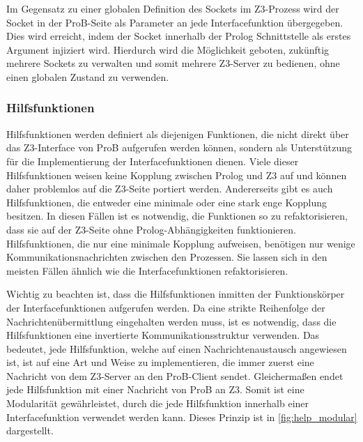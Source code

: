 Im Gegensatz zu einer globalen Definition des Sockets im Z3-Prozess wird der Socket in der ProB-Seite als Parameter an jede Interfacefunktion übergegeben.
Dies wird erreicht, indem der Socket innerhalb der Prolog Schnittstelle als erstes Argument injiziert wird.
Hierdurch wird die Möglichkeit geboten, zukünftig mehrere Sockets zu verwalten und somit mehrere Z3-Server zu bedienen, ohne einen globalen Zustand zu verwenden.

\subsubsection{Hilfsfunktionen}
\label{subsec:helper-functions}

Hilfsfunktionen werden definiert als diejenigen Funktionen, die nicht direkt über das Z3-Interface von ProB aufgerufen werden können,
sondern als Unterstützung für die Implementierung der Interfacefunktionen dienen.
Viele dieser Hilfsfunktionen weisen keine Kopplung zwischen Prolog und Z3 auf und können daher problemlos auf die Z3-Seite portiert werden.
Andererseits gibt es auch Hilfsfunktionen, die entweder eine minimale oder eine stark enge Kopplung besitzen.
In diesen Fällen ist es notwendig, die Funktionen so zu refaktorisieren, dass sie auf der Z3-Seite ohne Prolog-Abhängigkeiten funktionieren.
Hilfsfunktionen, die nur eine minimale Kopplung aufweisen, benötigen nur wenige Kommunikationsnachrichten zwischen den Prozessen.
Sie lassen sich in den meisten Fällen ähnlich wie die Interfacefunktionen refaktorisieren.

Wichtig zu beachten ist, dass die Hilfsfunktionen inmitten der Funktionskörper der Interfacefunktionen aufgerufen werden.
Da eine strikte Reihenfolge der Nachrichtenübermittlung eingehalten werden muss, ist es notwendig, dass die Hilfsfunktionen
eine invertierte Kommunikationsstruktur verwenden.
Das bedeutet, jede Hilfsfunktion, welche auf einen Nachrichtenaustausch angewiesen ist, ist auf eine Art und Weise zu implementieren,
die immer zuerst eine Nachricht von dem Z3-Server an den ProB-Client sendet.
Gleichermaßen endet jede Hilfsfunktion mit einer Nachricht von ProB an Z3.
Somit ist eine Modularität gewährleistet, durch die jede Hilfsfunktion innerhalb einer Interfacefunktion verwendet werden kann.
Dieses Prinzip ist in \cref{fig:help_modular} dargestellt.

